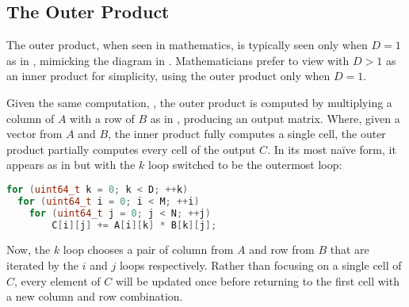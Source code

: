 \documentclass[\main/thesis.tex]{subfiles}
\begin{document}
\subsection{The Outer Product}
The outer product, when seen in mathematics, is typically seen only when $D=1$ as in , mimicking the diagram in .
Mathematicians prefer to view  with $D > 1$ as an inner product for simplicity, using the outer product only when $D=1$.

Given the same computation, , the outer product is computed by multiplying a column of $A$ with a row of $B$ as in , producing an output matrix.
Where, given a vector from $A$ and $B$, the inner product fully computes a single cell, the outer product partially computes every cell of the output $C$.
In its most na\"ive form, it appears as in  but with the $k$ loop switched to be the outermost loop:
\begin{lstlisting}[caption={[Basic outer product]A basic matrix multiplication via outer product.},label=lst:basicOuter,language=C++,columns=flexible,morekeywords=uint64_t]
for (uint64_t k = 0; k < D; ++k)
  for (uint64_t i = 0; i < M; ++i)
    for (uint64_t j = 0; j < N; ++j)
        C[i][j] += A[i][k] * B[k][j];
\end{lstlisting}
Now, the $k$ loop chooses a pair of column from $A$ and row from $B$ that are iterated by the $i$ and $j$ loops respectively.
Rather than focusing on a single cell of $C$, every element of $C$ will be updated once before returning to the first cell with a new column and row combination.
\end{document}
